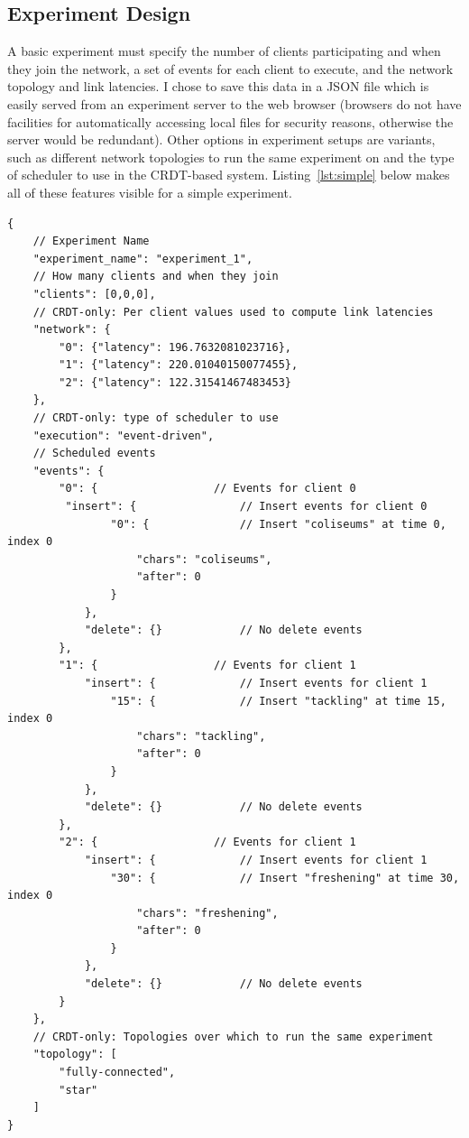 \documentclass[12pt,a4paper,twoside,openright]{report}
\begin{document}
	\subsection{Experiment Design}
	
	A basic experiment must specify the number of clients participating and when they join the network, a set of events for each client to execute, and the network topology and link latencies. I chose to save this data in a JSON file which is easily served from an experiment server to the web browser (browsers do not have facilities for automatically accessing local files for security reasons, otherwise the server would be redundant). Other options in experiment setups are variants, such as different network topologies to run the same experiment on and the type of scheduler to use in the CRDT-based system.	Listing~\ref{lst:simple} below makes all of these features visible for a simple experiment.
	

\begin{lstlisting}[caption={A simple JSON experiment setup. Comments added for explanation and not part of JSON syntax}, label={lst:simple}]
{
	// Experiment Name
    "experiment_name": "experiment_1", 	
	// How many clients and when they join
    "clients": [0,0,0],		
	// CRDT-only: Per client values used to compute link latencies	
    "network": {				
        "0": {"latency": 196.7632081023716}, 
        "1": {"latency": 220.01040150077455}, 
        "2": {"latency": 122.31541467483453}
    },
	// CRDT-only: type of scheduler to use
    "execution": "event-driven", 	
	// Scheduled events
    "events": {						
        "0": {					// Events for client 0
         "insert": {				// Insert events for client 0
                "0": {				// Insert "coliseums" at time 0, index 0
                    "chars": "coliseums", 
                    "after": 0
                }
            }, 
            "delete": {}			// No delete events
        }, 
        "1": {					// Events for client 1
            "insert": {				// Insert events for client 1
                "15": {				// Insert "tackling" at time 15, index 0
                    "chars": "tackling", 		
                    "after": 0
                }
            }, 
            "delete": {}			// No delete events
        }, 
        "2": {					// Events for client 1
            "insert": {				// Insert events for client 1
                "30": {				// Insert "freshening" at time 30, index 0
                    "chars": "freshening", 
                    "after": 0
                }
            }, 
            "delete": {}			// No delete events
        }
	},
	// CRDT-only: Topologies over which to run the same experiment
    "topology": [					
        "fully-connected", 
        "star"
    ]
}
\end{lstlisting}
\end{document}
